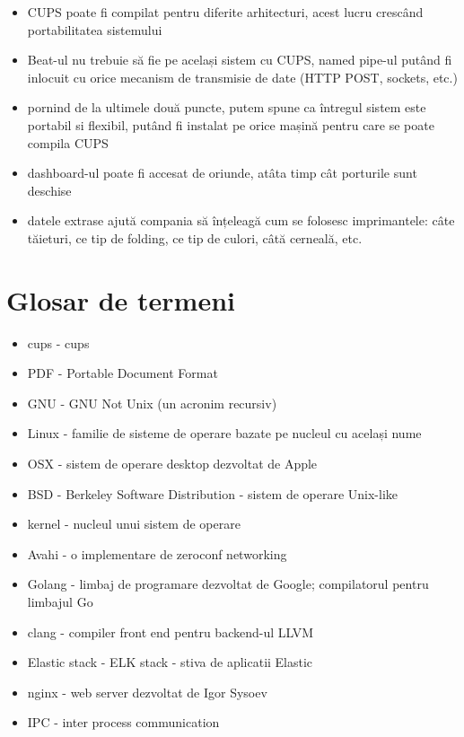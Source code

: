 \documentclass[a4paper, 12pt, twoside]{report}
\begin{document}
{\begin{itemize}
	\item CUPS poate fi compilat pentru diferite arhitecturi, acest lucru crescând portabilitatea sistemului
	\item Beat-ul nu trebuie să fie pe același sistem cu CUPS, named pipe-ul putând fi inlocuit cu orice mecanism de transmisie de date (HTTP POST, sockets, etc.)
	\item pornind de la ultimele două puncte, putem spune ca întregul sistem este portabil si flexibil, putând fi instalat pe orice mașină pentru care se poate compila CUPS
	\item dashboard-ul poate fi accesat de oriunde, atâta timp cât porturile sunt deschise
	\item datele extrase ajută compania să înțeleagă cum se folosesc imprimantele: câte tăieturi, ce tip de folding, ce tip de culori, câtă cerneală, etc.
\end{itemize}

\chapter{Glosar de termeni}
\begin{itemize}
\item \acrshort{cups} - \acrlong{cups}
\item PDF - Portable Document Format
\item GNU - GNU Not Unix (un acronim recursiv)
\item Linux - familie de sisteme de operare bazate pe nucleul cu același nume
\item OSX - sistem de operare desktop dezvoltat de Apple
\item BSD - Berkeley Software Distribution - sistem de operare Unix-like
\item kernel - nucleul unui sistem de operare
\item Avahi - o implementare de zeroconf networking
\item Golang - limbaj de programare dezvoltat de Google; compilatorul pentru limbajul Go
\item clang - compiler front end pentru backend-ul LLVM
\item Elastic stack - ELK stack - stiva de aplicatii Elastic
\item nginx - web server dezvoltat de Igor Sysoev
\item IPC - inter process communication
\end{itemize}

\listoffigures

}
\end{document}
